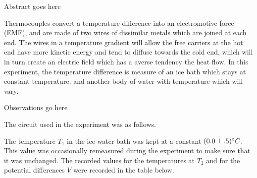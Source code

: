 
\physics

\begin{paperabs}
	
	Abstract goes here
	
\end{paperabs}

\begin{paper}
	

	Thermocouples convert a temperature difference into an electromotive force (EMF), and are made of two wires of dissimilar metals which are joined at each end. The wires in a temperature gradient will allow the free carriers at the hot end have more kinetic energy and tend to diffuse towards the cold end, which will in turn create an electric field which has a averse tendency the heat flow. In this experiment, the temperature difference is measure of an ice bath which stays at constant temperature, and another body of water with temperature which will vary. 
	

	Observations go here
	
	The circuit used in the experiment was as follows.
	
	
	The temperature $T_1$ in the ice water bath was kept at a constant $(0.0\pm.5)\degree C$.
	This value was occasionally remeasured during the experiment to make sure that it was unchanged.
	The recorded values for the temperatures at $T_2$ and for the potential differences $V$ were recorded in the table below.
	

\end{paper}
